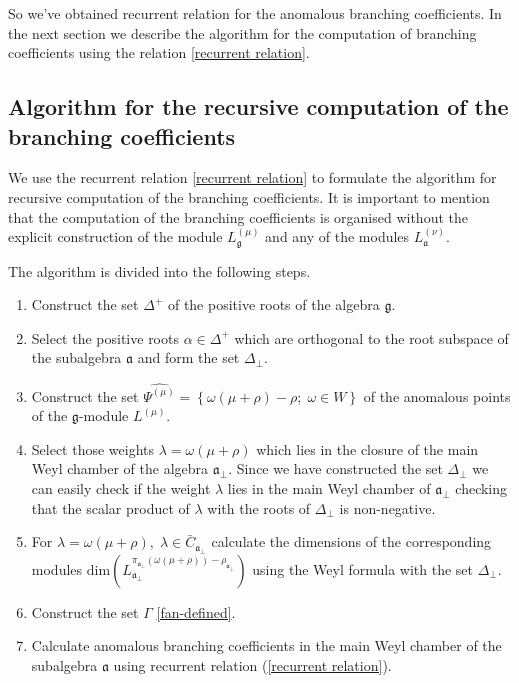 \documentclass[a4paper,12pt]{article}
\theoremstyle{definition} \newtheorem{Def}{Definition}
\begin{document}
So we've obtained recurrent relation for the anomalous branching coefficients.  In the next section we describe the algorithm for the computation of branching coefficients using the relation \eqref{recurrent relation}. 

\subsection{Algorithm for the recursive computation of the branching coefficients}
\label{sec:algorithm}

We use the recurrent relation \eqref{recurrent relation} to formulate the algorithm for recursive computation of the branching coefficients. It is important to mention that the computation of the branching coefficients is organised without the  explicit construction of the module $L^{(\mu)}_{\mathfrak{g}}$ and any of the modules $L^{(\nu)}_{\mathfrak{a}}$. 

The algorithm is divided into the following steps.
\begin{enumerate}
\item Construct the set $\Delta^{+}$ of the positive roots of the algebra $\mathfrak{g}$.
\item Select the positive roots $\alpha\in \Delta^{+}$ which are orthogonal to the root subspace of the subalgebra $\mathfrak{a}$ and form the set $\Delta_{\bot}$.
\item Construct the set $\widehat{\Psi^{(\mu)}}=\left\{\omega(\mu+\rho)-\rho;\; \omega\in W\right\}$ of the anomalous points of the $\mathfrak{g}$-module $L^{(\mu)}$.
\item Select those weights $\lambda=\omega(\mu+\rho)$ which lies in the closure of the main Weyl chamber of the algebra $\mathfrak{a}_{\bot}$. Since we have constructed the set $\Delta_{\bot}$ we can easily check if the weight $\lambda$ lies in the main Weyl chamber of $\mathfrak{a}_{\bot}$ checking that the scalar product of $\lambda$ with the roots of $\Delta_{\bot}$ is non-negative.
\item For $\lambda=\omega(\mu+\rho),\; \lambda\in \bar{C}_{\mathfrak{a}_{\bot}}$ calculate the dimensions of the corresponding modules $\mathrm{dim}\left(L^{\pi_{\mathfrak{a}_{\bot}}(\omega(\mu+\rho))-\rho_{\mathfrak{a}_{\bot}}}_{\mathfrak{a}_{\bot}}\right)$ using the Weyl formula with the set $\Delta_{\bot}$.
\item Construct the set $\Gamma$ \eqref{fan-defined}.
\item Calculate anomalous branching coefficients in the main Weyl
  chamber of the subalgebra $\mathfrak{a}$ using recurrent relation (\ref{recurrent relation}).
\end{enumerate}
\end{document}
